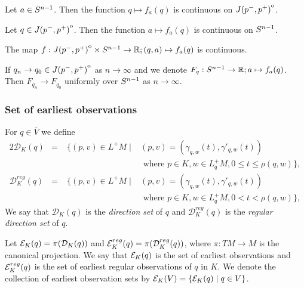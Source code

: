 \begin{lemma}\label{lem:qcont} Let $a\in S^{n-1}$. Then the function $q\mapsto f_a(q)$ is continuous on ${\kern0ptJ(p^-,p^+)}^{\mathrm{o}}$.
\end{lemma}

\begin{lemma}\label{lem:acont} Let $q\in {\kern0ptJ(p^-,p^+)}^{\mathrm{o}}$. Then the function $a\mapsto f_a(q)$ is continuous on $S^{n-1}$.
\end{lemma}

\begin{corollary}\label{cor:fcont} 
    The map $f:{\kern0ptJ(p^-,p^+)}^{\mathrm{o}}\times S^{n-1}\to\mathbb{R}; (q,a)\mapsto f_a(q)$ is continuous.
\end{corollary}

\begin{corollary}\label{cor:funif}
    If $q_n \to q_0\in {\kern0ptJ(p^-,p^+)}^{\mathrm{o}}$ as $n\to \infty$ and we denote $F_q:S^{n-1}\to\mathbb{R};a\mapsto f_a(q)$. Then $F_{q_n}\to F_{q_0}$ uniformly over $S^{n-1}$ as $n\to \infty$.
\end{corollary}


\subsubsection{Set of earliest observations}
\begin{definition}
For $q\in \overline{V}$ we define
\begin{alignat*}{2}
    \mathcal{D}_K(q) &=\; &\{(p,v)\in L^+M \mid &(p,v) = (\gamma_{q,w}(t),\gamma'_{q,w}(t)) \\
    &&&\text{ where } p\in K, w\in L_q^+M, 0\leq t \leq \rho(q,w)\},\\
    \mathcal{D}^{reg}_K(q) &=\; &\{(p,v)\in L^+M \mid &(p,v) = (\gamma_{q,w}(t),\gamma'_{q,w}(t)) \\
    &&&\text{ where } p\in K, w\in L_q^+M, 0 < t < \rho(q,w)\},
\end{alignat*}
We say that $\mathcal{D}_K(q)$ is the \emph{direction set} of $q$ and $\mathcal{D}^{reg}_K(q)$ is the \emph{regular direction set} of $q$.

Let $\mathcal{E}_K(q) = \pi(\mathcal{D}_K(q))$ and $\mathcal{E}^{reg}_K(q) = \pi(\mathcal{D}^{reg}_K(q))$, where $\pi:TM\to M$ is the canonical projection. We say that $\mathcal{E}_K(q)$ is the set of earliest observations and $\mathcal{E}^{reg}_K(q)$ is the set of earliest regular observations of $q$ in $K$. We denote the collection of earliest observation sets by $\mathcal{E}_K(V) = \{ \mathcal{E}_K(q) \mid q\in V\}$.
\end{definition}

